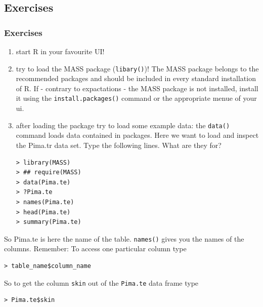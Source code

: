 \documentclass[xcolor={table},c]{beamer}
\begin{document}
\subsection{Exercises}
\begin{frame}\frametitle{Exercises}
  \begin{enumerate}
  \item start R in your favourite UI!
  \item try to load the MASS package (\texttt{libary()})! The MASS package belongs to the recommended packages and should be included in every standard installation of R. If - contrary to expactations - the MASS package is not installed, install it using the \texttt{install.packages()} command or the appropriate menue of your ui.
  \item after loading the package try to load some example data: the \texttt{data()} command loads data contained in packages. Here we want to load and inspect the Pima.tr data set. Type the following lines. What are they for?
\begin{verbatim}
> library(MASS)
> ## require(MASS)
> data(Pima.te)
> ?Pima.te
> names(Pima.te)
> head(Pima.te)
> summary(Pima.te)  
\end{verbatim}
\end{enumerate}
\item So Pima.te is here the name of the table. \texttt{names()} gives you the names of the columns. Remember: To access one particular column type 
\begin{verbatim}
> table_name$column_name
\end{verbatim}
\item So to get the column \texttt{skin} out of the \texttt{Pima.te} data frame type  
\begin{verbatim}
> Pima.te$skin
\end{verbatim}
\end{frame}
\end{document}
